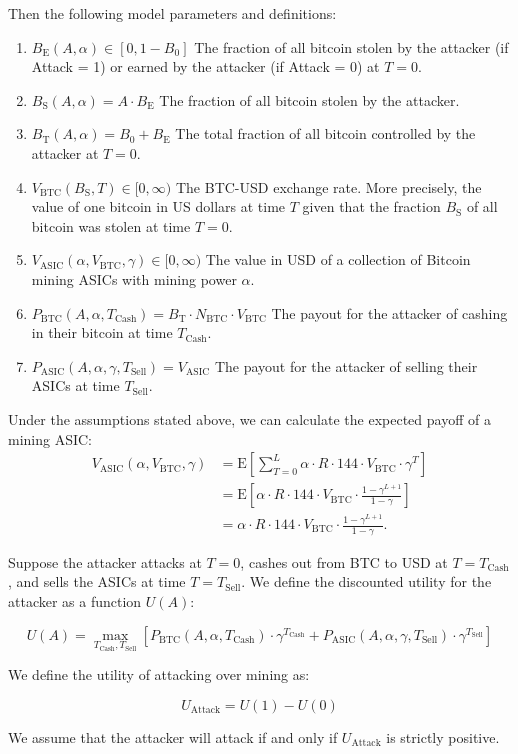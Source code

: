 \documentclass[12pt]{article}
\newcommand*{\Attack}{A}
\newcommand*{\Time}{T}
\newcommand*{\ABtcOrig}{{B_0}}
\newcommand*{\ABtcEarned}{{B_{\mathrm{E}}}}
\newcommand*{\ABtcStolen}{{B_{\mathrm{S}}}}
\newcommand*{\ABtcTotal}{{B_{\mathrm{T}}}}
\newcommand*{\NumBtc}{{N_{\mathrm{BTC}}}}
\newcommand*{\BlkReward}{{R}}
\newcommand*{\ExchgRate}{{V_{\mathrm{BTC}}}}
\newcommand*{\AsicValue}{{V_{\mathrm{ASIC}}}}
\newcommand*{\TimeCashOut}{{T_{\mathrm{Cash}}}}
\newcommand*{\TimeSellAsics}{{T_{\mathrm{Sell}}}}
\newcommand*{\Utility}{U}
\newcommand*{\AttackUtility}{{U_{\mathrm{Attack}}}}
\newcommand*{\PayoffBtc}{{P_{\mathrm{BTC}}}}
\newcommand*{\PayoffAsic}{{P_{\mathrm{ASIC}}}}
\newcommand*{\E}[1]{\mathrm{E}\left[#1\right]}
\newenvironment{defs}
  { \begin{enumerate}[labelindent=0pt,labelwidth=2.5in,itemindent=0em,align=parleft,leftmargin=!] }
  { \end{enumerate} }
\begin{document}
Then the following model parameters and definitions:

\begin{defs}
  \item[{$\ABtcEarned(\Attack, \alpha) \in [0, 1 - B_0]$}]
    The fraction of all bitcoin stolen by the attacker (if Attack = 1) or
    earned by the attacker (if Attack = 0) at $\Time = 0$.
  \item[{$\ABtcStolen(\Attack, \alpha)
      = \Attack \cdot \ABtcEarned$}]
    The fraction of all bitcoin stolen by the attacker.
  \item[{$\ABtcTotal(\Attack, \alpha)
      = \ABtcOrig + \ABtcEarned$}]
    The total fraction of all bitcoin controlled by the attacker at $\Time = 0$.
  \item[{$\ExchgRate(\ABtcStolen, \Time) \in [0, \infty)$}]
    The BTC-USD exchange rate. More precisely, the value of one bitcoin in US
    dollars at time $\Time$ given that the fraction $\ABtcStolen$ of all
    bitcoin was stolen at time $\Time = 0$.
  \item[{$\AsicValue(\alpha, \ExchgRate, \gamma) \in [0, \infty)$}]
    The value in USD of a collection of Bitcoin mining ASICs with mining power $\alpha$.
  \item[{$\PayoffBtc(\Attack, \alpha, \TimeCashOut)
      = \ABtcTotal \cdot \NumBtc \cdot \ExchgRate$}]
    The payout for the attacker of cashing in their bitcoin at time $\TimeCashOut$.
  \item[{$\PayoffAsic(\Attack, \alpha, \gamma, \TimeSellAsics)
      = \AsicValue$}]
    The payout for the attacker of selling their ASICs at time $\TimeSellAsics$.
\end{defs}

Under the assumptions stated above, we can calculate the expected payoff of a mining ASIC:
\begin{align*}
  \AsicValue(\alpha, \ExchgRate, \gamma)
  & = \E{\sum_{\Time=0}^L \alpha \cdot \BlkReward \cdot 144 \cdot \ExchgRate \cdot \gamma^\Time} \\
  & = \E{\alpha \cdot \BlkReward \cdot 144 \cdot \ExchgRate \cdot \frac{1 - \gamma^{L+1}}{1 - \gamma}} \\
  & = \alpha \cdot \BlkReward \cdot 144 \cdot \ExchgRate \cdot \frac{1 - \gamma^{L+1}}{1 - \gamma}.
\end{align*}

Suppose the attacker attacks at $\Time = 0$, cashes out from BTC to USD at
$\Time = \TimeCashOut$, and sells the ASICs at time $\Time = \TimeSellAsics$.
We define the discounted utility for the attacker as a function
$\Utility(\Attack)$:

\[
  \Utility(\Attack) =
  \max_{\TimeCashOut, \TimeSellAsics}
    \left[
        \PayoffBtc(\Attack, \alpha, \TimeCashOut)
          \cdot \gamma^\TimeCashOut
        + \PayoffAsic(\Attack, \alpha, \gamma, \TimeSellAsics)
          \cdot \gamma^\TimeSellAsics
    \right]
\]

We define the utility of attacking over mining as:

\[
  \AttackUtility = \Utility(1) - \Utility(0)
\]

We assume that the attacker will attack if and only if $\AttackUtility$ is
strictly positive.
\end{document}
